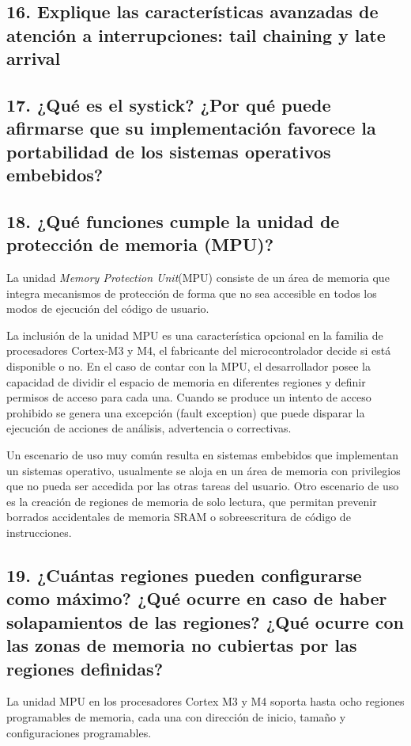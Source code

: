 \documentclass[10pt,a4paper,twoside,spanish]{article}	%
\begin{document}
\subsection*{16. Explique las características avanzadas de atención a interrupciones: tail chaining y late arrival}

\subsection*{17. ¿Qué es el systick? ¿Por qué puede afirmarse que su implementación favorece la portabilidad de los sistemas operativos embebidos?}

\subsection*{18. ¿Qué funciones cumple la unidad de protección de memoria (MPU)?}

La unidad \textit{Memory Protection Unit}(MPU) consiste de un área de memoria que integra mecanismos de protección de forma que no sea accesible en todos los modos de ejecución del código de usuario. 

La inclusión de la unidad MPU es una característica opcional en la familia de procesadores Cortex-M3 y M4, el fabricante del microcontrolador decide si está disponible o no. En el caso de contar con la MPU, el desarrollador posee la capacidad de dividir el espacio de memoria en diferentes regiones y definir permisos de acceso para cada una. Cuando se produce un intento de acceso prohibido se genera una excepción (fault exception) que puede disparar la ejecución de acciones de análisis, advertencia o correctivas. 

Un escenario de uso muy común resulta en sistemas embebidos que implementan un sistemas operativo, usualmente se aloja en un área de memoria con privilegios que no pueda ser accedida por las otras tareas del usuario. Otro escenario de uso es la creación de regiones de memoria de solo lectura, que permitan prevenir borrados accidentales de memoria SRAM o sobreescritura de código de instrucciones.

\subsection*{19. ¿Cuántas regiones pueden configurarse como máximo? ¿Qué ocurre en caso de haber solapamientos de las regiones? ¿Qué ocurre con las zonas de memoria no cubiertas por las regiones definidas?}

La unidad MPU en los procesadores Cortex M3 y M4 soporta hasta ocho regiones programables de memoria, cada una con dirección de inicio, tamaño y configuraciones programables.
\end{document}
